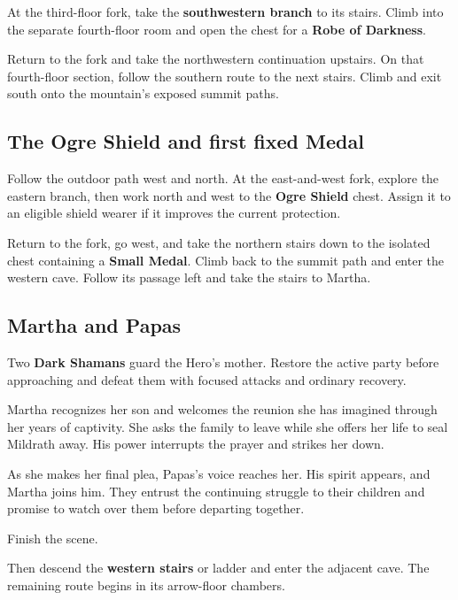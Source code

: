 At the third-floor fork, take the \textbf{southwestern branch}
to its stairs. Climb into the separate fourth-floor room and
open the chest for a \textbf{Robe of Darkness}.

Return to the fork and take the northwestern continuation
upstairs. On that fourth-floor section, follow the southern
route to the next stairs. Climb and exit south onto the
mountain's exposed summit paths.

\subsection*{The Ogre Shield and first fixed Medal}

Follow the outdoor path west and north. At the east-and-west
fork, explore the eastern branch, then work north and west
to the \textbf{Ogre Shield} chest. Assign it to an eligible
shield wearer if it improves the current protection.

Return to the fork, go west, and take the northern stairs
down to the isolated chest containing a \textbf{Small Medal}.
Climb back to the summit path and enter the western cave.
Follow its passage left and take the stairs to Martha.

\subsection*{Martha and Papas}

Two \textbf{Dark Shamans} guard the Hero's mother.
Restore the active party before approaching and defeat them
with focused attacks and ordinary recovery.

Martha recognizes her son and welcomes the reunion she has
imagined through her years of captivity. She asks the family
to leave while she offers her life to seal Mildrath away.
His power interrupts the prayer and strikes her down.

As she makes her final plea, Papas's voice reaches her.
His spirit appears, and Martha joins him. They entrust the
continuing struggle to their children and promise to watch
over them before departing together.

Finish the scene.


Then descend the \textbf{western stairs} or ladder and enter the adjacent cave. The remaining route
begins in its arrow-floor chambers.

